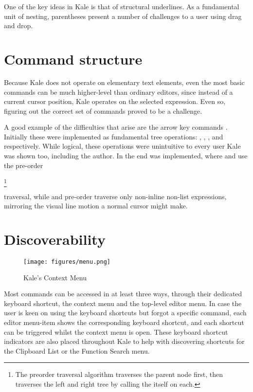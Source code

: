 \documentclass[11pt]{report}
\begin{document}
One of the key ideas in Kale is that of structural underlines. As a
fundamental unit of nesting, parentheses present a number of challenges to a
user using drag and drop.

\section{Command structure}

Because Kale does not operate on elementary text elements, even the most
basic
commands can be much higher-level than ordinary editors, since instead of a
current cursor position, Kale operates on the selected expression. Even so,
figuring out the correct set of commands proved to be a challenge.

A good example of the difficulties that arise are the arrow key commands
\ak{^}  \ak{<} \ak{>}. Initially these were implemented as
fundamental tree operations: , ,
, and  respectively.
While logical, these operations were unintuitive to every user
Kale was shown too, including the author. In the end  was
implemented, where \ak{<} and \ak{>} use the pre-order

\footnote{The preorder traversal algorithm traverses the parent node first,
then traverses the left and right tree by calling the itself on each.}

traversal, while \ak{^} and 
pre-order traverse only non-inline non-list expressions, mirroring the visual
line motion a normal cursor might make.

\section{Discoverability}
\setlength\intextsep{0pt}
\begin{wrapfigure}[21]{R}{5.5cm}
\texttt{[image: figures/menu.png]}
\caption{Kale's Context Menu}
\end{wrapfigure}
Most commands can be accessed in at least three ways, through their dedicated
keyboard shortcut, the context menu and the top-level editor menu. In case the
user is keen on using the keyboard shortcuts but forgot a specific command,
each editor menu-item shows the corresponding keyboard shortcut, and each
shortcut can be triggered whilst the context menu is open. These keyboard
shortcut indicators are also placed throughout Kale to help with discovering
shortcuts for the Clipboard List or the Function Search menu.
\end{document}
